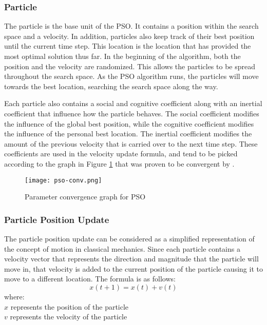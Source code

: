 \subsubsection{Particle}
The particle is the base unit of the PSO. It contains a position within the search space and a velocity. In addition, particles also keep track of their best position until the current time step. This location is the location that has provided the most optimal solution thus far. In the beginning of the algorithm, both the position and the velocity are randomized. This allows the particles to be spread throughout the search space. As the PSO algorithm runs, the particles will move towards the best location, searching the search space along the way.

Each particle also contains a social and cognitive coefficient along with an inertial coefficient that influence how the particle behaves. The social coefficient modifies the influence of the global best position, while the cognitive coefficient modifies the influence of the personal best location. The inertial coefficient modifies the amount of the previous velocity that is carried over to the next time step. These coefficients are used in the velocity update formula, and tend to be picked according to the graph in Figure \ref{fig:pso-convergence} that was proven to be convergent by \cite{englebrecht-pso}.

\begin{figure}
  \centering
  \texttt{[image: pso-conv.png]}
  \caption{Parameter convergence graph for PSO\cite{englebrecht-pso}}
  \label{fig:pso-convergence}
\end{figure}

\subsubsection{Particle Position Update}
The particle position update can be considered as a simplified representation of the concept of motion in classical mechanics. Since each particle contains a velocity vector that represents the direction and magnitude that the particle will move in, that velocity is added to the current position of the particle causing it to move to a different location. The formula is as follows:
\begin{equation} \label{eqn:loc-update}
 x(t+1) = x(t) + v(t)
\end{equation}
where:\\
\indent $x$ represents the position of the particle\\
\indent $v$ represents the velocity of the particle

